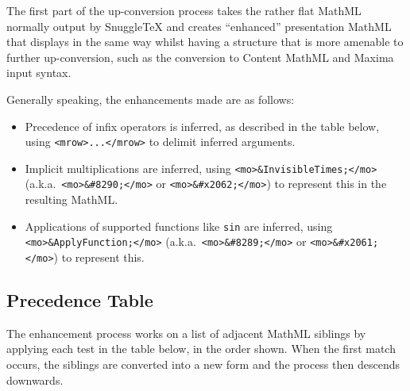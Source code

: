 
\newcommand{\ue}[1]{\upConversionExample{#1}}

The first part of the up-conversion process takes the rather flat MathML normally
output by SnuggleTeX and creates ``enhanced'' presentation MathML that displays in the
same way whilst having a structure that is more amenable to further up-conversion,
such as the conversion to Content MathML and Maxima input syntax.

Generally speaking, the enhancements made are as follows:

\begin{itemize}
\item Precedence of infix operators is inferred, as described in the table
below, using \verb|<mrow>...</mrow>| to delimit inferred arguments.
\item Implicit multiplications are inferred, using \verb|<mo>&InvisibleTimes;</mo>|
(a.k.a.\ \verb|<mo>&#8290;</mo>| or \verb|<mo>&#x2062;</mo>|)
to represent this in the resulting MathML.
\item Applications of supported functions like \verb|sin| are inferred, using
\verb|<mo>&ApplyFunction;</mo>| (a.k.a.\ \verb|<mo>&#8289;</mo>| or \verb|<mo>&#x2061;</mo>|)
to represent this.
\end{itemize}

\subsection*{Precedence Table}

The enhancement process works on a list of adjacent MathML siblings by applying
each test in the table below, in the order shown. When the first match occurs,
the siblings are converted into a new form and the process then descends
downwards.

